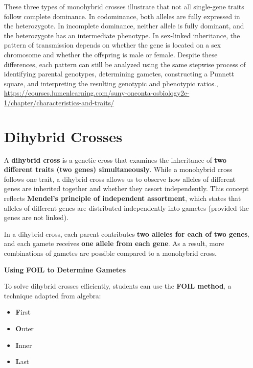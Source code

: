 \documentclass[
  letterpaper,
  DIV=11,
  numbers=noendperiod]{scrreprt}
\begin{document}
These three types of monohybrid crosses illustrate that not all
single-gene traits follow complete dominance. In codominance, both
alleles are fully expressed in the heterozygote. In incomplete
dominance, neither allele is fully dominant, and the heterozygote has an
intermediate phenotype. In sex-linked inheritance, the pattern of
transmission depends on whether the gene is located on a sex chromosome
and whether the offspring is male or female. Despite these differences,
each pattern can still be analyzed using the same stepwise process of
identifying parental genotypes, determining gametes, constructing a
Punnett square, and interpreting the resulting genotypic and phenotypic
ratios.,
\url{https://courses.lumenlearning.com/suny-oneonta-osbiology2e-1/chapter/characteristics-and-traits/}

\section{\texorpdfstring{\textbf{Dihybrid
Crosses}}{Dihybrid Crosses}}\label{dihybrid-crosses}

A \textbf{dihybrid cross} is a genetic cross that examines the
inheritance of \textbf{two different traits (two genes) simultaneously}.
While a monohybrid cross follows one trait, a dihybrid cross allows us
to observe how alleles of different genes are inherited together and
whether they assort independently. This concept reflects
\textbf{Mendel's principle of independent assortment}, which states that
alleles of different genes are distributed independently into gametes
(provided the genes are not linked).

In a dihybrid cross, each parent contributes \textbf{two alleles for
each of two genes}, and each gamete receives \textbf{one allele from
each gene}. As a result, more combinations of gametes are possible
compared to a monohybrid cross.

\textbf{Using FOIL to Determine Gametes}

To solve dihybrid crosses efficiently, students can use the \textbf{FOIL
method}, a technique adapted from algebra:

\begin{itemize}
\item
  \textbf{F}irst
\item
  \textbf{O}uter
\item
  \textbf{I}nner
\item
  \textbf{L}ast
\end{itemize}
\end{document}

